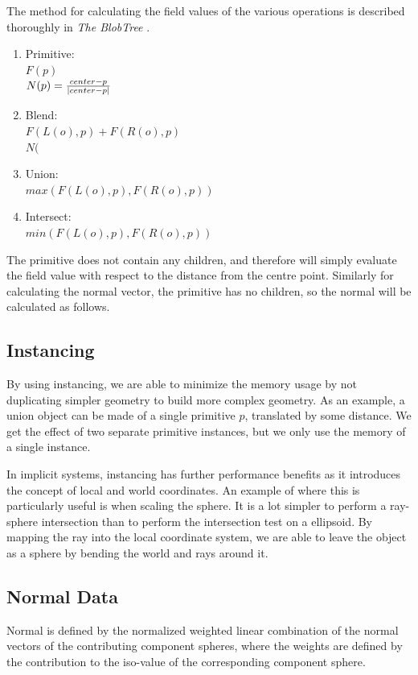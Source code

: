 \documentclass[conference]{acmsiggraph}
\begin{document}
The method for calculating the field values of the various operations is
described thoroughly in \textit{The BlobTree} \cite{Wyvill}.

\begin{enumerate}
	\item Primitive:\\
		$F(p)$\\
		$N(p) = {center - p \over | center - p |}$
	\item Blend:\\
		$F(L(o), p) + F(R(o), p)$\\
		$N( $

	\item Union:\\
		$max(F(L(o), p), F(R(o), p))$
	\item Intersect:\\
		$min(F(L(o), p), F(R(o), p))$
\end{enumerate}

The primitive does not contain any children, and therefore will simply
evaluate the field value with respect to the distance from the centre point.
Similarly for calculating the normal vector, the primitive has no children, so
the normal will be calculated as follows.

\subsection{Instancing}
By using instancing, we are able to minimize the memory usage by not
duplicating simpler geometry to build more complex geometry. As an example, a
union object can be made of a single primitive $p$, translated by some
distance. We get the effect of two separate primitive instances, but we only
use the memory of a single instance.

In implicit systems, instancing has further performance benefits as it
introduces the concept of local and world coordinates. An example of where this
is particularly useful is when scaling the sphere. It is a lot simpler to
perform a ray-sphere intersection than to perform the intersection test on a
ellipsoid. By mapping the ray into the local coordinate system, we are able to
leave the object as a sphere by bending the world and rays around it.

\subsection{Normal Data}
Normal is defined by the normalized weighted linear combination of the normal
vectors of the contributing component spheres, where the weights are defined by
the contribution to the iso-value of the corresponding component
sphere\cite{Wyvill}.
\end{document}
